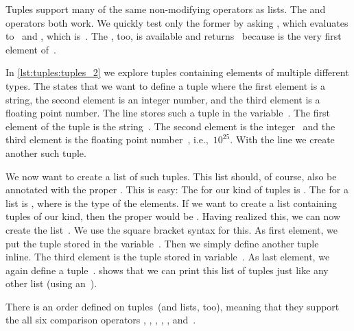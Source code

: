 Tuples support many of the same non-modifying operators as lists.
The  and  operators both work.
We quickly test only the former by asking , which evaluates to~ and , which is~.
The , too, is available and  returns~ because  is the very first element of~.
%
\begin{sloppypar}%
In \cref{lst:tuples:tuples_2} we explore tuples containing elements of multiple different types.
The   states that we want to define a tuple where the first element is a string, the second element is an integer number, and the third element is a floating point number.
The line  stores such a tuple in the variable~.
The first element of the tuple is the string~.
The second element is the integer~ and the third element is the floating point number~, i.e.,~$10^{25}$.
With the line  we create another such tuple.%
\end{sloppypar}%
%
\begin{sloppypar}%
We now want to create a list of such tuples.
This list should, of course, also be annotated with the proper .
This is easy:
The  for our kind of tuples is .
The  for a list is , where  is the type of the elements.
If we want to create a list containing tuples of our kind, then the proper  would be .
Having realized this, we can now create the list~.
We use the square bracket syntax for this.
As first element, we put the tuple stored in the variable~.
Then we simply define another tuple~ inline.
The third element is the tuple stored in variable~.
As last element, we again define a tuple~.
 shows that we can print this list of tuples just like any other list (using an~).%
\end{sloppypar}%
%
There is an order defined on tuples~(and lists, too), meaning that they support the all six comparison operators \pythonilIdx{<}, \pythonilIdx{<=}, \pythonilIdx{==}, \pythonilIdx{>=}, \pythonilIdx{>}, and~\pythonil{!=}.
